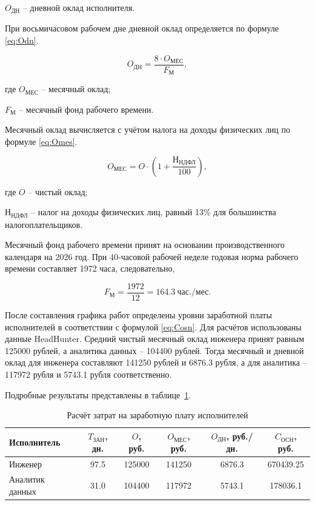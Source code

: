 $O_{\text{ДН}}$ -- дневной оклад исполнителя.

При восьмичасовом рабочем дне дневной оклад определяется по формуле \eqref{eq:Odn}.

\begin{equation}\label{eq:Odn}
O_{\text{ДН}} = \frac{8 \cdot O_{\text{МЕС}}}{F_{\text{М}}},
\end{equation}

где $O_{\text{МЕС}}$ -- месячный оклад;

$F_{\text{М}}$ -- месячный фонд рабочего времени.

Месячный оклад вычисляется с учётом налога на доходы физических лиц по формуле \eqref{eq:Omes}.

\begin{equation}\label{eq:Omes}
O_{\text{МЕС}} = O \cdot \left(1 + \frac{\text{Н}_{\text{НДФЛ}}}{100}\right),
\end{equation}

где $O$ -- чистый оклад;

$\text{Н}_{\text{НДФЛ}}$ -- налог на доходы физических лиц, равный 13\% для большинства налогоплательщиков.

Месячный фонд рабочего времени принят на основании производственного календаря на 2026 год. При 40-часовой рабочей неделе годовая норма рабочего времени составляет 1972 часа, следовательно,

$$
F_{\text{М}} = \frac{1972}{12} = 164.3 \ \text{час./мес.}
$$

После составления графика работ определены уровни заработной платы исполнителей в соответствии с формулой \eqref{eq:Cosn}. Для расчётов использованы данные HeadHunter. Средний чистый месячный оклад инженера принят равным 125000 рублей, а аналитика данных -- 104400 рублей. Тогда месячный и дневной оклад для инженера составляют 141250 рублей и 6876.3 рубля, а для аналитика -- 117972 рубля и 5743.1 рубля соответственно.

Подробные результаты представлены в таблице~\ref{tab:salary_calc}.

\begin{table}[h!]
    \centering
    \caption{Расчёт затрат на заработную плату исполнителей}
    \label{tab:salary_calc}
    \begin{tabular}{|p{3.2cm}|c|c|c|c|c|}
        \hline
        Исполнитель & $T_{\text{ЗАН}}$, дн. & $O$, руб. & $O_{\text{МЕС}}$, руб. & $O_{\text{ДН}}$, руб./дн. & $C_{\text{ОСН}}$, руб. \\
        \hline
        Инженер & 97.5 & 125000 & 141250 & 6876.3 & 670439.25 \\
        \hline
        Аналитик данных & 31.0 & 104400 & 117972 & 5743.1 & 178036.1 \\
        \hline
    \end{tabular}
\end{table}

